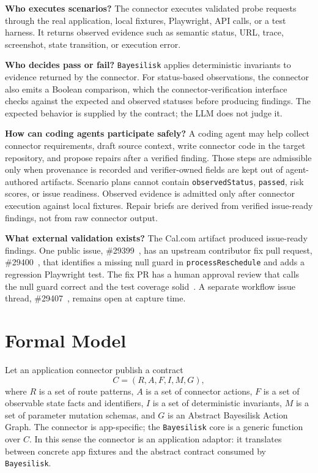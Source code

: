 \documentclass[10pt]{article}
\newcommand{\tool}{\texttt{Bayesilisk}\xspace}
\begin{document}
\textbf{Who executes scenarios?} The connector executes validated probe requests
through the real application, local fixtures, Playwright, API calls, or a test
harness. It returns observed evidence such as semantic status, URL, trace,
screenshot, state transition, or execution error.

\textbf{Who decides pass or fail?} \tool applies deterministic invariants to
evidence returned by the connector. For status-based observations, the connector
also emits a Boolean comparison, which the connector-verification interface
checks against the expected and observed statuses before producing findings.
The expected behavior is supplied by the contract; the LLM does not judge it.

\textbf{How can coding agents participate safely?} A coding agent may help
collect connector requirements, draft source context, write connector code in
the target repository, and propose repairs after a verified finding. Those
steps are admissible only when provenance is recorded and verifier-owned fields
are kept out of agent-authored artifacts. Scenario plans cannot contain
\texttt{observedStatus}, \texttt{passed}, risk scores, or issue readiness.
Observed evidence is admitted only after connector execution against local
fixtures. Repair briefs are derived from verified issue-ready findings, not from
raw connector output.

\textbf{What external validation exists?} The Cal.com artifact produced
issue-ready findings. One public issue, \#29399~\cite{calcomIssue}, has an
upstream contributor fix pull request, \#29400~\cite{calcomFixPr}, that
identifies a missing null guard in \texttt{processReschedule} and adds a
regression Playwright test. The fix PR has a human approval review that calls
the null guard correct and the test coverage solid~\cite{calcomFixReview}. A
separate workflow issue thread, \#29407~\cite{calcomCancelledIssue}, remains
open at capture time.

\section{Formal Model}

Let an application connector publish a contract
\[
  C = (R, A, F, I, M, G),
\]
where \(R\) is a set of route patterns, \(A\) is a set of connector actions,
\(F\) is a set of observable state facts and identifiers, \(I\) is a set of
deterministic invariants, \(M\) is a set of parameter mutation schemas, and
\(G\) is an Abstract Bayesilisk Action Graph. The connector is app-specific; the
\tool core is a generic function over \(C\). In this sense the connector is an
application adaptor: it translates between concrete app fixtures and the
abstract contract consumed by \tool.
\end{document}
